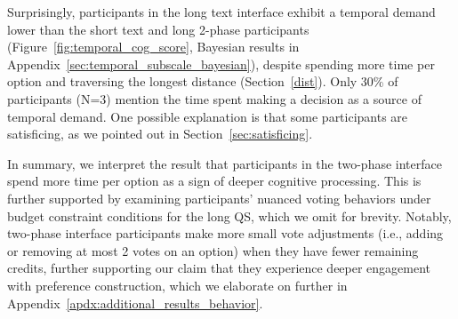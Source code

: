 Surprisingly, participants in the long text interface exhibit a temporal demand lower than the short text and long 2-phase participants (Figure~\ref{fig:temporal_cog_score}, Bayesian results in Appendix~\ref{sec:temporal_subscale_bayesian}), despite spending more time per option and traversing the longest distance (Section~\ref{dist}). Only 30\% of participants (N=3) mention the time spent making a decision as a source of temporal demand. One possible explanation is that some participants are satisficing, as we pointed out in Section~\ref{sec:satisficing}.  

In summary, we interpret the result that participants in the two-phase interface spend more time per option as a sign of deeper cognitive processing. This is further supported by examining participants' nuanced voting behaviors under budget constraint conditions for the long QS, which we omit for brevity. Notably, two-phase interface participants make more small vote adjustments (i.e., adding or removing at most 2 votes on an option) when they have fewer remaining credits, further supporting our claim that they experience deeper engagement with preference construction, which we elaborate on further in Appendix~\ref{apdx:additional_results_behavior}.
